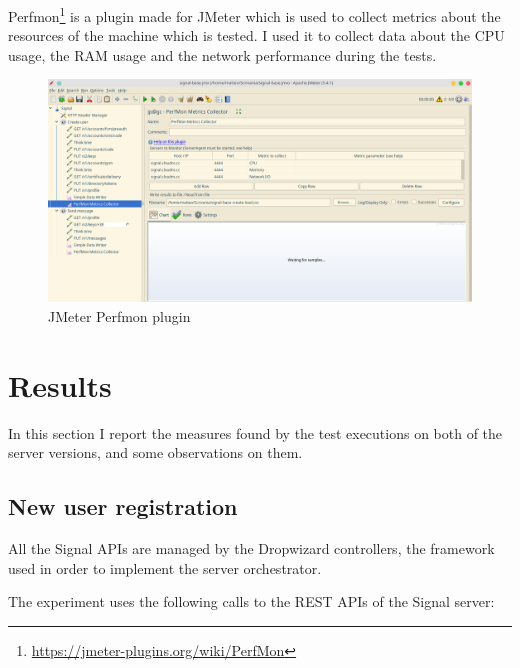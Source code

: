 Perfmon\footnote{\url{https://jmeter-plugins.org/wiki/PerfMon}} is a plugin made for JMeter which is used to collect metrics about the resources of the machine which is tested.
I used it to collect data about the CPU usage, the RAM usage and the network performance during the tests.

\begin{figure}[H]
    \centering
    \includegraphics[width=\textwidth]{images/perfmon}
    \caption{JMeter Perfmon plugin}
    \label{fig:jmeterperfmon}
\end{figure}



\section{Results\label{sec:results}}

In this section I report the measures found by the test executions on both of the server versions, and some observations on them.

\subsection{New user registration\label{sec:newuser}}

All the Signal APIs are managed by the Dropwizard controllers, the framework used in order to implement the server orchestrator.

The experiment uses the following calls to the REST APIs of the Signal server:

